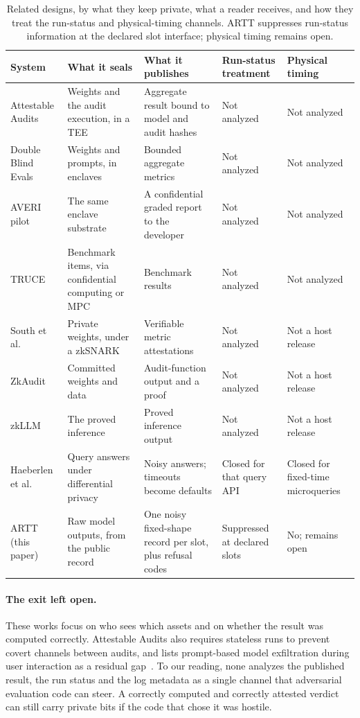 \documentclass[10pt,twocolumn]{article}
\begin{document}
\begin{table}[t]
\centering\small
\setlength{\tabcolsep}{3pt}
\begin{tabular}{@{}>{\raggedright\arraybackslash}p{}>{\raggedright\arraybackslash}p{}>{\raggedright\arraybackslash}p{}>{\raggedright\arraybackslash}p{}>{\raggedright\arraybackslash}p{}@{}}
\toprule
System & What it seals & What it publishes & Run-status treatment & Physical timing\\
\midrule
Attestable Audits & Weights and the audit execution, in a TEE & Aggregate result bound to model and audit hashes & Not analyzed & Not analyzed\\
Double Blind Evals & Weights and prompts, in enclaves & Bounded aggregate metrics & Not analyzed & Not analyzed\\
AVERI pilot & The same enclave substrate & A confidential graded report to the developer & Not analyzed & Not analyzed\\
TRUCE & Benchmark items, via confidential computing or MPC & Benchmark results & Not analyzed & Not analyzed\\
South et al. & Private weights, under a zkSNARK & Verifiable metric attestations & Not analyzed & Not a host release\\
ZkAudit & Committed weights and data & Audit-function output and a proof & Not analyzed & Not a host release\\
zkLLM & The proved inference & Proved inference output & Not analyzed & Not a host release\\
Haeberlen et al. & Query answers under differential privacy & Noisy answers; timeouts become defaults & Closed for that query API & Closed for fixed-time microqueries\\
ARTT (this paper) & Raw model outputs, from the public record & One noisy fixed-shape record per slot, plus refusal codes & Suppressed at declared slots & No; remains open\\
\bottomrule
\end{tabular}
\caption{Related designs, by what they keep private, what a reader receives, and how they treat the run-status and physical-timing channels. ARTT suppresses run-status information at the declared slot interface; physical timing remains open.}
\label{tab:related}
\end{table}

\paragraph{The exit left open.} These works focus on who sees which assets and on whether the result was computed correctly. Attestable Audits also requires stateless runs to prevent covert channels between audits, and lists prompt-based model exfiltration during user interaction as a residual gap~\cite{attestable}. To our reading, none analyzes the published result, the run status and the log metadata as a single channel that adversarial evaluation code can steer. A correctly computed and correctly attested verdict can still carry private bits if the code that chose it was hostile.
\end{document}

